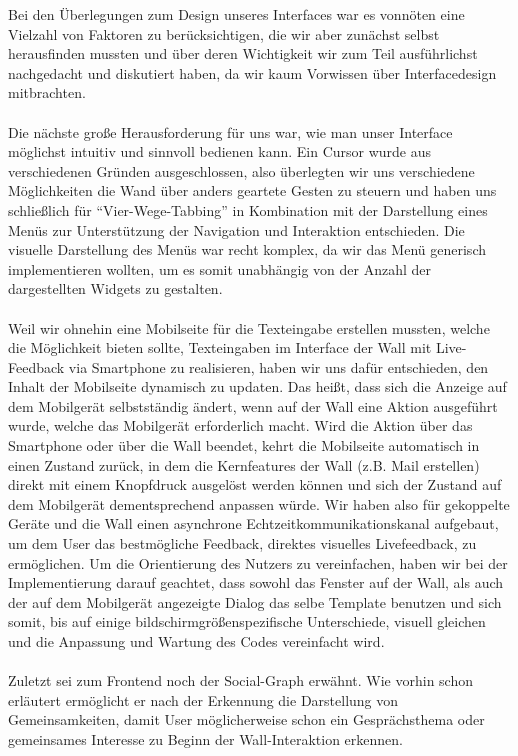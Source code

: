 \documentclass[10pt,a4paper]{report}
\begin{document}
	Bei den Überlegungen zum Design unseres Interfaces war es vonnöten eine Vielzahl von Faktoren zu berücksichtigen, die wir aber zunächst selbst herausfinden mussten und über deren Wichtigkeit wir zum Teil ausführlichst nachgedacht und diskutiert haben, da wir kaum Vorwissen über Interfacedesign mitbrachten.\\\\
	Die nächste große Herausforderung für uns war, wie man unser Interface möglichst intuitiv und sinnvoll bedienen kann. Ein Cursor wurde aus verschiedenen Gründen ausgeschlossen, also überlegten wir uns verschiedene Möglichkeiten die Wand über anders geartete Gesten zu steuern und haben uns schließlich für "`Vier-Wege-Tabbing"' in Kombination mit der Darstellung eines Menüs zur Unterstützung der Navigation und Interaktion entschieden. Die visuelle Darstellung des Menüs war recht komplex, da wir das Menü generisch implementieren wollten, um es somit unabhängig von der Anzahl der dargestellten Widgets zu gestalten.\\\\
	Weil wir ohnehin eine Mobilseite für die Texteingabe erstellen mussten, welche die Möglichkeit bieten sollte, Texteingaben im Interface der Wall mit Live-Feedback via Smartphone zu realisieren, haben wir uns dafür entschieden, den Inhalt der Mobilseite dynamisch zu updaten. Das heißt, dass sich die Anzeige auf dem Mobilgerät selbstständig ändert, wenn auf der Wall eine Aktion ausgeführt wurde, welche das Mobilgerät erforderlich macht. Wird die Aktion über das Smartphone oder über die Wall beendet, kehrt die Mobilseite automatisch in einen Zustand zurück, in dem die Kernfeatures der Wall (z.B. Mail erstellen) direkt mit einem Knopfdruck ausgelöst werden können und sich der Zustand auf dem Mobilgerät dementsprechend anpassen würde. Wir haben also für gekoppelte Geräte und die Wall einen asynchrone Echtzeitkommunikationskanal aufgebaut, um dem User das bestmögliche Feedback, direktes visuelles Livefeedback, zu ermöglichen. Um die Orientierung des Nutzers zu vereinfachen, haben wir bei der Implementierung darauf geachtet, dass sowohl das Fenster auf der Wall, als auch der auf dem Mobilgerät angezeigte Dialog das selbe Template benutzen und sich somit, bis auf einige bildschirmgrößenspezifische Unterschiede, visuell gleichen und die Anpassung und Wartung des Codes vereinfacht wird.
\\\\
Zuletzt sei zum Frontend noch der Social-Graph erwähnt. Wie vorhin schon erläutert ermöglicht er nach der Erkennung die Darstellung von Gemeinsamkeiten, damit User möglicherweise schon ein Gesprächsthema oder gemeinsames Interesse zu Beginn der Wall-Interaktion erkennen. \\
\end{document}
